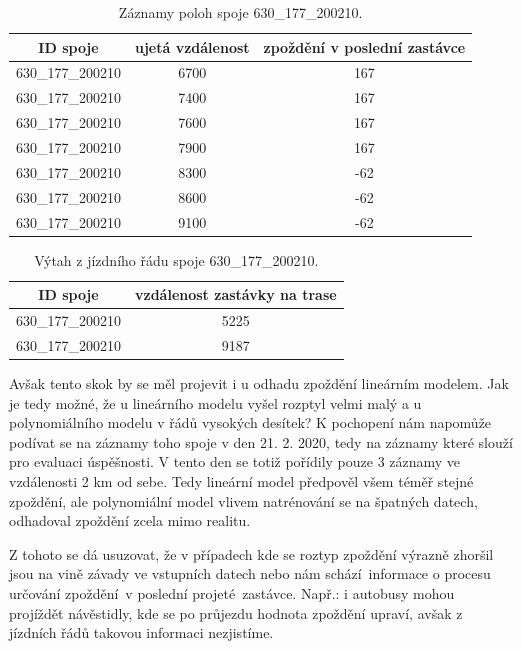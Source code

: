 \begin{center}
	\begin{table}[ht]
\centering
\begin{tabular}{|c|c|c|}
\hline
ID spoje & ujetá vzdálenost & zpoždění v poslední zastávce \\ \hline \hline
630\_177\_200210 & 6700 & 167 \\ \hline
630\_177\_200210 & 7400 & 167 \\ \hline
630\_177\_200210 & 7600 & 167 \\ \hline
630\_177\_200210 & 7900 & 167 \\ \hline
630\_177\_200210 & 8300 & -62 \\ \hline
630\_177\_200210 & 8600 & -62 \\ \hline
630\_177\_200210 & 9100 & -62 \\ \hline
\end{tabular}
\label{table:825_samples}
\caption{Záznamy poloh spoje 630\_177\_200210.}
\end{table}
\end{center}

\begin{center}
	\begin{table}[ht]
\centering
\begin{tabular}{|c|c|}
\hline
ID spoje & vzdálenost zastávky na trase \\ \hline \hline
630\_177\_200210 & 5225 \\ \hline
630\_177\_200210 & 9187 \\ \hline
\end{tabular}
\label{tab:825_ride}
\caption{Výtah z jízdního řádu spoje 630\_177\_200210.}
\end{table}
\end{center}

\bigbreak

Avšak tento skok by se měl projevit i u odhadu zpoždění lineárním modelem. Jak je tedy možné, že u lineárního modelu vyšel rozptyl velmi malý a u polynomiálního modelu v řádů vysokých desítek? K pochopení nám napomůže podívat se na záznamy toho spoje v den 21. 2. 2020, tedy na záznamy které slouží pro evaluaci úspěšnosti. V tento den se totiž pořídily pouze 3 záznamy ve vzdálenosti 2 km od sebe. Tedy lineární model předpověl všem téměř stejné zpoždění, ale polynomiální model vlivem natrénování se na špatných datech, odhadoval zpoždění zcela mimo realitu.

\bigbreak

Z tohoto se dá usuzovat, že v případech kde se roztyp zpoždění výrazně zhoršil jsou na vině závady ve vstupních datech nebo nám schází informace o procesu určování zpoždění v poslední projeté zastávce. Např.: i autobusy mohou projíždět návěstidly, kde se po průjezdu hodnota zpoždění upraví, avšak z jízdních řádů takovou informaci nezjistíme.

